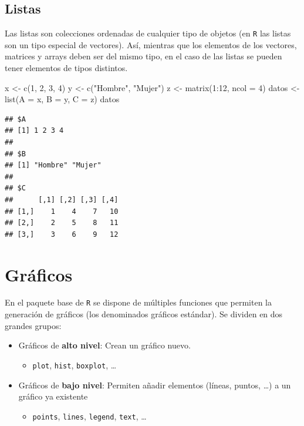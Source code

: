 \documentclass[
]{book}
\newenvironment{Shaded}{\begin{snugshade}}{\end{snugshade}}
\newcommand{\AttributeTok}[1]{\textcolor[rgb]{0.77,0.63,0.00}{#1}}
\newcommand{\DecValTok}[1]{\textcolor[rgb]{0.00,0.00,0.81}{#1}}
\newcommand{\FunctionTok}[1]{\textcolor[rgb]{0.00,0.00,0.00}{#1}}
\newcommand{\NormalTok}[1]{#1}
\newcommand{\OtherTok}[1]{\textcolor[rgb]{0.56,0.35,0.01}{#1}}
\newcommand{\SpecialCharTok}[1]{\textcolor[rgb]{0.00,0.00,0.00}{#1}}
\newcommand{\StringTok}[1]{\textcolor[rgb]{0.31,0.60,0.02}{#1}}
\providecommand{\tightlist}{%
  \setlength{\itemsep}{0pt}\setlength{\parskip}{0pt}}
\theoremstyle{break}
\theoremstyle{nonumberplain}
\begin{document}
\hypertarget{listas}{%
\section{Listas}\label{listas}}

Las listas son colecciones ordenadas de cualquier tipo de objetos (en \texttt{R} las listas son un tipo especial de vectores).
Así, mientras que los elementos de los vectores, matrices y arrays deben ser del mismo tipo, en el caso de las listas se pueden tener elementos de tipos distintos.

\begin{Shaded}
\begin{Highlighting}[]
\NormalTok{x }\OtherTok{\textless{}{-}} \FunctionTok{c}\NormalTok{(}\DecValTok{1}\NormalTok{, }\DecValTok{2}\NormalTok{, }\DecValTok{3}\NormalTok{, }\DecValTok{4}\NormalTok{)}
\NormalTok{y }\OtherTok{\textless{}{-}} \FunctionTok{c}\NormalTok{(}\StringTok{"Hombre"}\NormalTok{, }\StringTok{"Mujer"}\NormalTok{)}
\NormalTok{z }\OtherTok{\textless{}{-}} \FunctionTok{matrix}\NormalTok{(}\DecValTok{1}\SpecialCharTok{:}\DecValTok{12}\NormalTok{, }\AttributeTok{ncol =} \DecValTok{4}\NormalTok{)}
\NormalTok{datos }\OtherTok{\textless{}{-}} \FunctionTok{list}\NormalTok{(}\AttributeTok{A =}\NormalTok{ x, }\AttributeTok{B =}\NormalTok{ y, }\AttributeTok{C =}\NormalTok{ z)}
\NormalTok{datos}
\end{Highlighting}
\end{Shaded}

\begin{verbatim}
## $A
## [1] 1 2 3 4
## 
## $B
## [1] "Hombre" "Mujer" 
## 
## $C
##      [,1] [,2] [,3] [,4]
## [1,]    1    4    7   10
## [2,]    2    5    8   11
## [3,]    3    6    9   12
\end{verbatim}

\hypertarget{graficos}{%
\chapter{Gráficos}\label{graficos}}

En el paquete base de \texttt{R} se dispone de múltiples funciones que permiten la generación de gráficos (los denominados gráficos estándar). Se dividen en dos grandes grupos:

\begin{itemize}
\item
  Gráficos de \textbf{alto nivel}: Crean un gráfico nuevo.

  \begin{itemize}
  \tightlist
  \item
    \texttt{plot}, \texttt{hist}, \texttt{boxplot}, \ldots{}
  \end{itemize}
\item
  Gráficos de \textbf{bajo nivel}: Permiten añadir elementos (líneas, puntos, \ldots) a un gráfico ya existente

  \begin{itemize}
  \tightlist
  \item
    \texttt{points}, \texttt{lines}, \texttt{legend}, \texttt{text}, \ldots{}
  \end{itemize}
\end{itemize}
\end{document}
